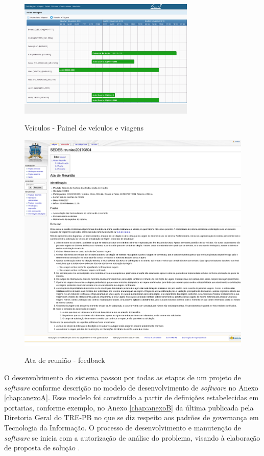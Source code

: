 \begin{figure}[!htb]
    \centering
    \caption{Veículos - Painel de veículos e viagens}
    \includegraphics[width=0.75\textwidth]{./dados/figuras/veiculos-tela2.png}
    \label{fig:figura-motoristas}
\end{figure}

\begin{figure}[!htb]
    \centering
    \caption{Ata de reunião - feedback}
    \includegraphics[width=1\textwidth]{./dados/figuras/veiculos-ata1.png}
    \label{fig:figura-ata1}
\end{figure}

O desenvolvimento do sistema passou por todas as etapas de um projeto de \textit{software} conforme descrição no modelo de desenvolvimento de \textit{software} no Anexo \ref{chap:anexoA}. Esse modelo foi construído a partir de definições estabelecidas em portarias, conforme exemplo, no Anexo \ref{chap:anexoB} da última publicada pela Diretoria Geral do TRE-PB no que se diz respeito aos padrões de governança em Tecnologia da Informação.
O processo de desenvolvimento e manutenção de \textit{software} se inicia com a autorização de análise do problema, visando à elaboração de proposta de solução  \cite[p.~2]{Portaria37:2017}.
 

